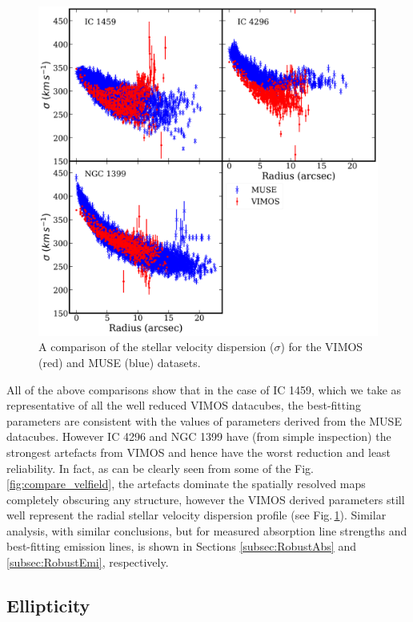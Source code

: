 			\begin{figure}
				\centering
				\includegraphics[width=.9\textwidth]{chapter4/compare_sigma.png}
				\caption[Comparison between stellar velocity dispersion radial profiles from VIMOS and MUSE datacubes]{A comparison of the stellar velocity dispersion ($\sigma$) for the VIMOS (red) and MUSE (blue) datasets.}
				\label{fig:compare_sigprofile}
			\end{figure}

			All of the above comparisons show that in the case of IC 1459, which we take as representative of all the well reduced VIMOS datacubes, the best-fitting parameters are consistent with the values of parameters derived from the MUSE datacubes. However IC 4296 and NGC 1399 have (from simple inspection) the strongest artefacts from VIMOS and hence have the worst reduction and least reliability. In fact, as can be clearly seen from some of the Fig.\,\ref{fig:compare_velfield}, the artefacts dominate the spatially resolved maps completely obscuring any structure, however the VIMOS derived parameters still well represent the radial stellar velocity dispersion profile (see Fig.\,\ref{fig:compare_sigprofile}). Similar analysis, with similar conclusions, but for measured absorption line strengths and best-fitting emission lines, is shown in Sections \ref{subsec:RobustAbs} and \ref{subsec:RobustEmi}, respectively.


	\subsection{Ellipticity}
		\label{subsec:Ellipticity}

